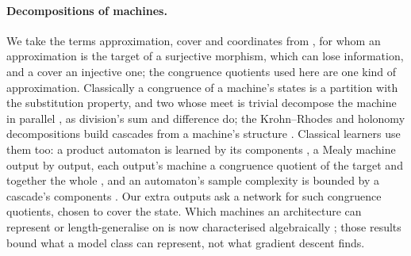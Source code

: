 \documentclass[11pt]{article}
\begin{document}
\paragraph{Decompositions of machines.} We take the terms approximation, cover and coordinates from
\citet{egri-nagy-2024-covering-lemma-transformation-semigroups}, for whom an approximation is the
target of a surjective morphism, which can lose information, and a cover an injective one; the
congruence quotients used here are one kind of approximation. Classically a congruence of a machine's
states is a partition with the substitution property, and two whose meet is trivial decompose the
machine in parallel \citep{hartmanis-stearns-1966-algebraic-structure-theory}, as division's sum and
difference do; the Krohn--Rhodes and holonomy decompositions build cascades from a machine's
structure
\citep{krohn-rhodes-1965-algebraic-theory-machines,egri-nagy-2015-computational-holonomy-decomposition}.
Classical learners use them too: a product automaton is learned by its components
\citep{moerman-2017-learning-product-automata}, a Mealy machine output by output, each output's
machine a congruence quotient of the target and together the whole
\citep{koenders-2024-output-decomposed-learning-mealy}, and an automaton's sample complexity is
bounded by a cascade's components \citep{ronca-2023-automata-cascades-expressivity-sample-complexity}.
Our extra outputs ask a network for such congruence quotients, chosen to cover the state. Which
machines an architecture can represent or length-generalise on is now characterised algebraically
\citep{yang-2026-algebraic-decomposition-transformer-length-generalization,shakerinava-2026-expressive-limits-diagonal-ssm-state-tracking,nowak-2026-algebraic-view-recurrent-language-models};
those results bound what a model class can represent, not what gradient descent finds.
\end{document}
